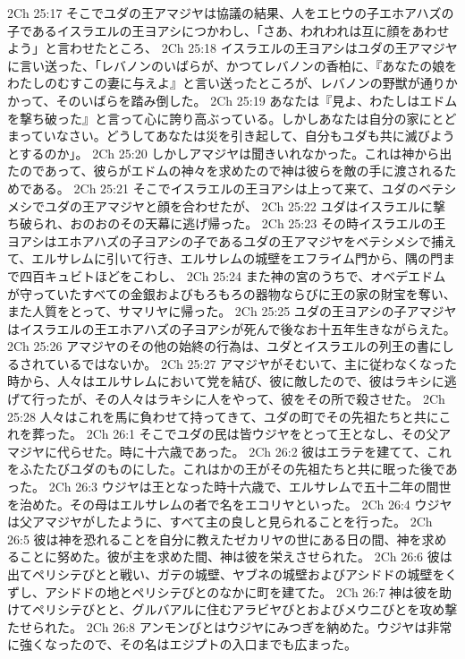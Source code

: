2Ch 25:17  そこでユダの王アマジヤは協議の結果、人をエヒウの子エホアハズの子であるイスラエルの王ヨアシにつかわし、「さあ、われわれは互に顔をあわせよう」と言わせたところ、
2Ch 25:18  イスラエルの王ヨアシはユダの王アマジヤに言い送った、「レバノンのいばらが、かつてレバノンの香柏に、『あなたの娘をわたしのむすこの妻に与えよ』と言い送ったところが、レバノンの野獣が通りかかって、そのいばらを踏み倒した。
2Ch 25:19  あなたは『見よ、わたしはエドムを撃ち破った』と言って心に誇り高ぶっている。しかしあなたは自分の家にとどまっていなさい。どうしてあなたは災を引き起して、自分もユダも共に滅びようとするのか」。
2Ch 25:20  しかしアマジヤは聞きいれなかった。これは神から出たのであって、彼らがエドムの神々を求めたので神は彼らを敵の手に渡されるためである。
2Ch 25:21  そこでイスラエルの王ヨアシは上って来て、ユダのベテシメシでユダの王アマジヤと顔を合わせたが、
2Ch 25:22  ユダはイスラエルに撃ち破られ、おのおのその天幕に逃げ帰った。
2Ch 25:23  その時イスラエルの王ヨアシはエホアハズの子ヨアシの子であるユダの王アマジヤをベテシメシで捕えて、エルサレムに引いて行き、エルサレムの城壁をエフライム門から、隅の門まで四百キュビトほどをこわし、
2Ch 25:24  また神の宮のうちで、オベデエドムが守っていたすべての金銀およびもろもろの器物ならびに王の家の財宝を奪い、また人質をとって、サマリヤに帰った。
2Ch 25:25  ユダの王ヨアシの子アマジヤはイスラエルの王エホアハズの子ヨアシが死んで後なお十五年生きながらえた。
2Ch 25:26  アマジヤのその他の始終の行為は、ユダとイスラエルの列王の書にしるされているではないか。
2Ch 25:27  アマジヤがそむいて、主に従わなくなった時から、人々はエルサレムにおいて党を結び、彼に敵したので、彼はラキシに逃げて行ったが、その人々はラキシに人をやって、彼をその所で殺させた。
2Ch 25:28  人々はこれを馬に負わせて持ってきて、ユダの町でその先祖たちと共にこれを葬った。
2Ch 26:1  そこでユダの民は皆ウジヤをとって王となし、その父アマジヤに代らせた。時に十六歳であった。
2Ch 26:2  彼はエラテを建てて、これをふたたびユダのものにした。これはかの王がその先祖たちと共に眠った後であった。
2Ch 26:3  ウジヤは王となった時十六歳で、エルサレムで五十二年の間世を治めた。その母はエルサレムの者で名をエコリヤといった。
2Ch 26:4  ウジヤは父アマジヤがしたように、すべて主の良しと見られることを行った。
2Ch 26:5  彼は神を恐れることを自分に教えたゼカリヤの世にある日の間、神を求めることに努めた。彼が主を求めた間、神は彼を栄えさせられた。
2Ch 26:6  彼は出てペリシテびとと戦い、ガテの城壁、ヤブネの城壁およびアシドドの城壁をくずし、アシドドの地とペリシテびとのなかに町を建てた。
2Ch 26:7  神は彼を助けてペリシテびとと、グルバアルに住むアラビヤびとおよびメウニびとを攻め撃たせられた。
2Ch 26:8  アンモンびとはウジヤにみつぎを納めた。ウジヤは非常に強くなったので、その名はエジプトの入口までも広まった。
